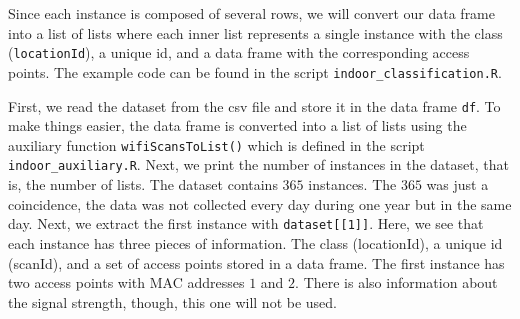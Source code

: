 \documentclass[
  11pt,
]{krantz}
\newenvironment{Shaded}{\begin{snugshade}}{\end{snugshade}}
\newcommand{\AttributeTok}[1]{\textcolor[rgb]{0.61,0.61,0.61}{#1}}
\newcommand{\CommentTok}[1]{\textcolor[rgb]{0.37,0.37,0.37}{\textit{#1}}}
\newcommand{\DecValTok}[1]{\textcolor[rgb]{0.06,0.06,0.06}{#1}}
\newcommand{\FunctionTok}[1]{\textcolor[rgb]{0,0,0}{#1}}
\newcommand{\NormalTok}[1]{#1}
\newcommand{\OtherTok}[1]{\textcolor[rgb]{0.37,0.37,0.37}{#1}}
\begin{document}
Since each instance is composed of several rows, we will convert our data frame into a list of lists where each inner list represents a single instance with the class (\texttt{locationId}), a unique id, and a data frame with the corresponding access points. The example code can be found in the script \texttt{indoor\_classification.R}.

\begin{Shaded}
\end{Shaded}

First, we read the dataset from the csv file and store it in the data frame \texttt{df}. To make things easier, the data frame is converted into a list of lists using the auxiliary function \texttt{wifiScansToList()} which is defined in the script \texttt{indoor\_auxiliary.R}. Next, we print the number of instances in the dataset, that is, the number of lists. The dataset contains \(365\) instances. The \(365\) was just a coincidence, the data was not collected every day during one year but in the same day. Next, we extract the first instance with \texttt{dataset{[}{[}1{]}{]}}. Here, we see that each instance has three pieces of information. The class (locationId), a unique id (scanId), and a set of access points stored in a data frame. The first instance has two access points with MAC addresses \(1\) and \(2\). There is also information about the signal strength, though, this one will not be used.
\end{document}
